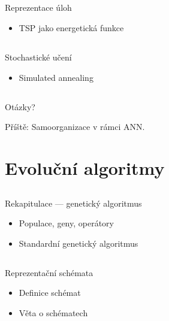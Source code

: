 \documentclass{beamer}
\begin{document}
\subsection{}
\begin{frame}{Reprezentace úloh}
\begin{itemize}
\item TSP jako energetická funkce
\end{itemize}
\end{frame}

\subsection{}
\begin{frame}{Stochastické učení}
\begin{itemize}
\item Simulated annealing
\end{itemize}
\end{frame}

\subsection{}
\begin{frame}{Otázky?}
\begin{center}
Příště: Samoorganizace v rámci ANN.
\end{center}
\end{frame}

\section{Evoluční algoritmy}

\subsection{}
\begin{frame}{Rekapitulace --- genetický algoritmus}
\begin{itemize}
\item Populace, geny, operátory
\item Standardní genetický algoritmus
\end{itemize}
\end{frame}

\subsection{}
\begin{frame}{Reprezentační schémata}
\begin{itemize}
\item Definice schémat
\item Věta o schématech
\end{itemize}
\end{frame}
\end{document}
